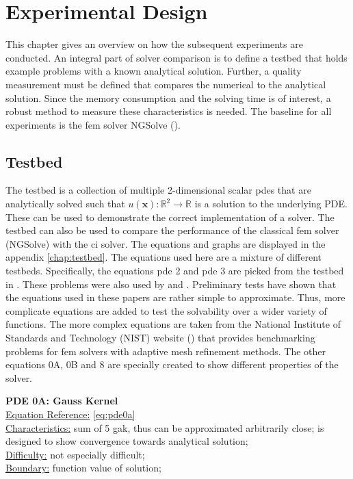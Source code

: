 \documentclass[./\jobname.tex]{subfiles}
\begin{document}
\chapter{Experimental Design}
This chapter gives an overview on how the subsequent experiments are conducted. An integral part of solver comparison is to define a testbed that holds example problems with a known analytical solution. Further, a quality measurement must be defined that compares the numerical to the analytical solution. Since the memory consumption and the solving time is of interest, a robust method to measure these characteristics is needed. The baseline for all experiments is the \gls{fem} solver NGSolve (\cite{schoberl_ngsolvengsolve_2020}). 

\section{Testbed}
\label{chap:testbed_description}
The testbed is a collection of multiple 2-dimensional scalar \gls{pde}s that are analytically solved such that $u(\mathbf{x}): \mathbb{R}^2 \rightarrow \mathbb{R}$ is a solution to the underlying PDE. These can be used to demonstrate the correct implementation of a solver. The testbed can also be used to compare the performance of the classical \gls{fem} solver (NGSolve) with the \gls{ci} solver. The equations and graphs are displayed in the appendix \ref{chap:testbed}. The equations used here are a mixture of different testbeds. Specifically, the equations \gls{pde} 2 and \gls{pde} 3 are picked from the testbed in \cite{chaquet_using_2019}. These problems were also used by \cite{tsoulos_solving_2006} and \cite{panagant_solving_2014}. Preliminary tests have shown that the equations used in these papers are rather simple to approximate. Thus, more complicate equations are added to test the solvability over a wider variety of functions. The more complex equations are taken from the National Institute of Standards and Technology (NIST) website (\cite{mitchell_nist_2018}) that provides benchmarking problems for \gls{fem} solvers with adaptive mesh refinement methods. The other equations 0A, 0B and 8 are specially created to show different properties of the solver. 

\textbf{PDE 0A: Gauss Kernel} \\
\underline{Equation Reference:} \eqref{eq:pde0a} \\
\underline{Characteristics:} sum of 5 \gls{gak}, thus can be approximated arbitrarily close; is designed to show convergence towards analytical solution; \\
\underline{Difficulty:} not especially difficult; \\
\underline{Boundary:} function value of solution; \\
\end{document}
